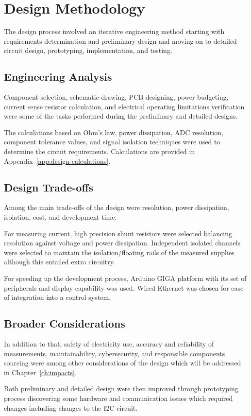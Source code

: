 
\chapter{Design Methodology}
\label{ch:methodology}

The design process involved an iterative engineering method
starting with requirements determination and preliminary
design and moving on to detailed circuit design, prototyping,
implementation, and testing.

\section{Engineering Analysis}

Component selection, schematic drawing, PCB designing,
power budgeting, current sense resistor calculation,
and electrical operating limitations verification were
some of the tasks performed during the preliminary and
detailed designs.

The calculations based on Ohm's law, power dissipation,
ADC resolution, component tolerance values, and signal
isolation techniques were used to determine the circuit
requirements. Calculations are provided in
Appendix~\ref{app:design-calculations}.

\section{Design Trade-offs}

Among the main trade-offs of the design were resolution,
power dissipation, isolation, cost, and development time.

For measuring current, high precision shunt resistors were
selected balancing resolution against voltage and power
dissipation. Independent isolated channels were selected to
maintain the isolation/floating rails of the measured supplies although
this entailed extra circuitry.

For speeding up the development process, Arduino GIGA
platform with its set of peripherals and display capability
was used. Wired Ethernet was chosen for ease of integration into a control system.

\section{Broader Considerations}

In addition to that, safety of electricity use,
accuracy and reliability of measurements, maintainability,
cybersecurity, and responsible components sourcing were
among other considerations of the design which will be
addressed in Chapter~\ref{ch:impacts}.

Both preliminary and detailed design were then improved
through prototyping process discovering some hardware and
communication issues which required changes including
changes to the I2C circuit.